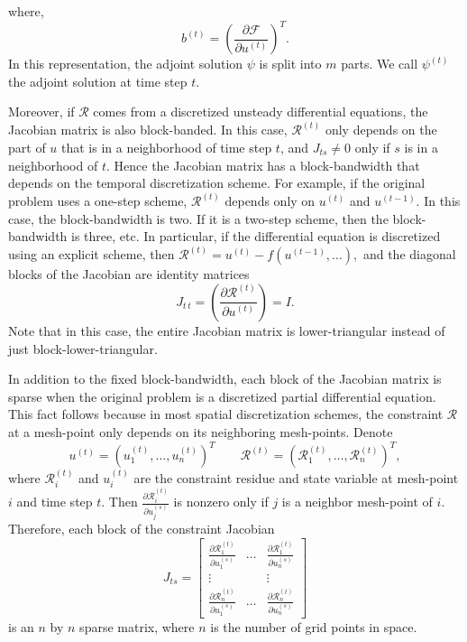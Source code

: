 \documentclass{elsart}
\theoremstyle{remark}
\theoremstyle{definition}
\theoremstyle{proof}
\begin{document}
    where,
    \[ b^{(t)} =
        \left( \frac{\partial \mathcal{F}}{\partial u^{(t)}} \right)^T.
    \]
    In this representation, the adjoint solution $\psi$ is split into $m$ parts.
    We call $\psi^{(t)}$ the adjoint solution at time step $t$.
    
    Moreover, if $\mathcal{R}$ comes from a discretized unsteady
    differential equations, the Jacobian matrix is also block-banded.  In
    this case, $\mathcal{R}^{(t)}$ only depends on the part of $u$ that
    is in a neighborhood of time step $t$, and $J_{t s} \ne 0$ only if
    $s$ is in a neighborhood of $t$.  Hence the Jacobian matrix has a
    block-bandwidth that depends on the temporal discretization scheme.
    For example, if the original problem uses a one-step scheme,
    $\mathcal{R}^{(t)}$ depends only on $u^{(t)}$ and $u^{(t-1)}$.  In
    this case, the block-bandwidth is two.  If it is a two-step scheme,
    then the block-bandwidth is three, etc.  In particular, if the
    differential equation is discretized using an explicit scheme, then
    $ \mathcal{R}^{(t)} = u^{(t)} - f(u^{(t-1)},\ldots) ,$
    and the diagonal blocks of the Jacobian are identity matrices
    $$ J_{t\,t} =
        \left( \frac{\partial \mathcal{R}^{(t)}}{\partial u^{(t)}} \right) = I.
    $$
    Note that in this case, the entire Jacobian matrix is
    lower-triangular instead of just block-lower-triangular.
    
    In addition to the fixed block-bandwidth, each block of the Jacobian matrix
    is sparse when the original problem is a discretized partial differential
    equation.   This fact follows because in most spatial discretization
    schemes, the constraint $\mathcal{R}$ at a mesh-point only depends on
    its neighboring mesh-points. Denote
    \[ u^{(t)} = \left( u_1^{(t)}, \ldots, u_n^{(t)} \right)^T  \qquad
        \mathcal{R}^{(t)} = \left( \mathcal{R}_1^{(t)}, \ldots,
        \mathcal{R}_n^{(t)} \right)^T,
    \]
    where $\mathcal{R}_i^{(t)}$ and $u_i^{(t)}$ are the constraint residue and
    state variable at mesh-point $i$ and time step $t$.  Then
    $\frac{\partial \mathcal{R}_i^{(t)}}{\partial u_j^{(s)}}$ is nonzero only
    if $j$ is a neighbor mesh-point of $i$.  Therefore, each block of the
    constraint Jacobian
    \[ J_{t s} =
        \begin{bmatrix}
            \frac{\partial \mathcal{R}_1^{(t)}}{\partial u_1^{(s)}} & \ldots &
                \frac{\partial \mathcal{R}_1^{(t)}}{\partial u_n^{(s)}} \\
            \vdots & & \vdots \\
            \frac{\partial \mathcal{R}_n^{(t)}}{\partial u_1^{(s)}} & \ldots &
                \frac{\partial \mathcal{R}_n^{(t)}}{\partial u_n^{(s)}}
        \end{bmatrix}
    \]
    is an $n$ by $n$ sparse matrix, where $n$ is the number of grid points
    in space.
    
\end{document}
